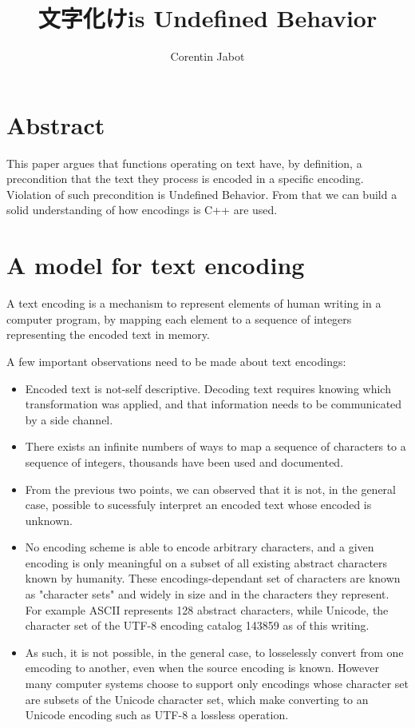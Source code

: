 \documentclass{wg21}
\title{文字化け\footnotemark is Undefined Behavior}
\author{Corentin Jabot}{corentin.jabot@gmail.com}
\let\ACMmaketitle=\maketitle
\renewcommand{\maketitle}{\begingroup\let\footnote=\thanks \ACMmaketitle\endgroup}
\begin{document}
\maketitle



\section{Abstract}

This paper argues that functions operating on text have, by definition, a precondition that the text they process is
encoded in a specific encoding. Violation of such precondition is Undefined Behavior.
From that we can build a solid understanding of how encodings is C++ are used.

\section{A model for text encoding}

A text encoding is a mechanism to represent elements of human writing in a computer program,
by mapping each element to a sequence of integers representing the encoded text in memory.

A few important observations need to be made about text encodings:
\begin{itemize}
\item Encoded text is not-self descriptive. Decoding text requires knowing which transformation was applied, and that information needs to be communicated by a side channel.
\item There exists an infinite numbers of ways to map a sequence of characters to a sequence of integers, thousands have been used and documented. 
\item From the previous two points, we can observed that it is not, in the general case, possible to sucessfuly interpret an encoded text whose encoded is unknown.
\item No encoding scheme is able to encode arbitrary characters, and a given encoding is only meaningful on a subset of all existing abstract characters known by humanity. These encodings-dependant set of characters are known as "character sets" and widely in size and in the characters they represent. For example ASCII represents 128 abstract characters, while Unicode, the character set of the UTF-8 encoding catalog 143859 as of this writing.
\item As such, it is not possible, in the general case, to losselessly convert from one emcoding to another, even when the source encoding is known. However many computer systems choose to support only encodings whose character set are subsets of the Unicode character set, which make converting to an Unicode encoding such as UTF-8 a lossless operation.
\end{itemize}
\end{document}
